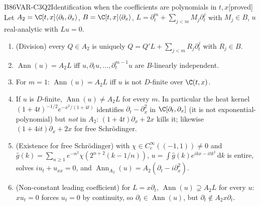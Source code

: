\documentclass[11pt,a4paper,oneside]{report}
\newcommand{\badge}[2]{\textcolor{#1}{\textsf{\footnotesize[#2]}}}
\newcommand{\proved}{\badge{cC}{proved}}
\newcommand{\Ann}{\operatorname{Ann}}
\newcommand{\dd}{\,\mathrm{d}}
\newenvironment{dimcard}[5]{\par\Needspace{12\baselineskip}\begin{dimcardbox}{#1}{#2}{#3}{#4}{#5}}{\end{dimcardbox}}
\begin{document}
\begin{dimcard}{B86}{VAR-C3Q2}{Identification when the coefficients are polynomials in $t,x$}{\proved}{}
Let $A_2=\C[t,x]\langle\partial_t,\partial_x\rangle$, $B=\C[t,x]\langle\partial_x\rangle$, $L=\partial_t^m+\sum_{j<m}M_j\partial_t^j$ with $M_j\in B$, $u$ real-analytic with $Lu=0$.
\begin{enumerate}[label=(\alph*)]
\item (Division) every $Q\in A_2$ is uniquely $Q=Q'L+\sum_{j<m}R_j\partial_t^j$ with $R_j\in B$.
\item $\Ann(u)=A_2L$ iff $u,\partial_tu,\dots,\partial_t^{m-1}u$ are $B$-linearly independent.
\item For $m=1$: $\Ann(u)=A_2L$ iff $u$ is not $D$-finite over $\C(t,x)$.
\item If $u$ is $D$-finite, $\Ann(u)\ne A_2L$ for every $m$. In particular the heat kernel $(1+4t)^{-1/2}e^{-x^2/(1+4t)}$ identifies $\partial_t-\partial_x^2$ in $\C[\partial_t,\partial_x]$ (it is not exponential-polynomial) but \emph{not} in $A_2$: $(1+4t)\partial_x+2x$ kills it; likewise $(1+4it)\partial_x+2x$ for free Schr\"odinger.
\item (Existence for free Schr\"odinger) with $\chi\in C_c^\infty((-1,1))\ne0$ and $\hat g(k)=\sum_{n\ge1}e^{-n^2}\chi(2^{n+2}(k-1/n))$, $u=\int\hat g(k)e^{ikx-itk^2}\dd k$ is entire, solves $iu_t+u_{xx}=0$, and $\Ann_{A_2}(u)=A_2(\partial_t-i\partial_x^2)$.
\item (Non-constant leading coefficient) for $L=x\partial_t$, $\Ann(u)\supsetneq A_2L$ for every $u$: $xu_t=0$ forces $u_t=0$ by continuity, so $\partial_t\in\Ann(u)$, but $\partial_t\notin A_2x\partial_t$.
\end{enumerate}
\end{dimcard}
\end{document}
